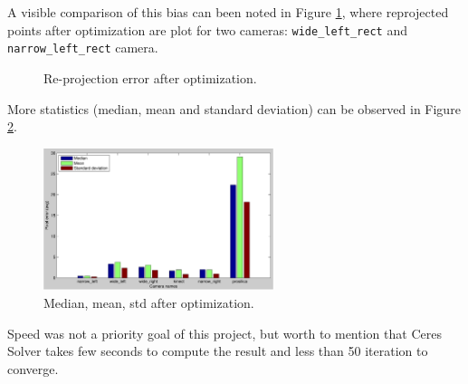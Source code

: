 A visible comparison of this bias can been noted in Figure \ref{fig:reprojection}, where reprojected points after optimization are plot for two cameras: \texttt{wide\_left\_rect} and \texttt{narrow\_left\_rect} camera.
\begin{figure}[!htbp]
  \centering
  \caption{Re-projection error after optimization.}
  \label{fig:reprojection}
\end{figure}



More statistics (median, mean and standard deviation) can be observed in Figure \ref{fig:stats}.
\begin{figure}[!htbp]
 \centering
 \includegraphics[width=0.6\textwidth]{images/stats.pdf}
 \caption{Median, mean, std after optimization.}
 \label{fig:stats}
\end{figure}


Speed was not a priority goal of this project, but worth to mention that Ceres Solver takes few seconds to compute the result and less than 50 iteration to converge.


